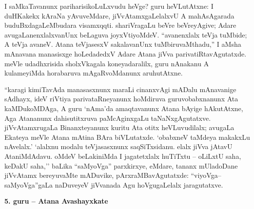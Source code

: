 I saMkaTavanunx pariharisikoLuLxvudu heVge? guru heVLutAtxne: I duHKakekx kAraNa yAvuveMdare, jiVvAtamxgaLelalxvU A mahAsAgarada buduBxdagaLeMbudara visamxqqti. shariVragaLu beVre beVreyAgive; Adare avugaLanenxlalxvanUnx beLaguva joyxVtiyoMdeV. ``avanenxlalx teVja tuMbide; A teVja avaneV. Atana teVjasesxV sakalavanUnx tuMbiruvaMthadu,'' I aMsha mAnavana manasisxge hoLedadedxV Adare Atana jiVva parivatiRtavAgutatxde. meVle udadhxrisida sholxVkagala koneyadaralilx, guru nAnakanu A kulameyiMda horabaruva mAgaRvoMdanunx aruhutAtxne.

``karagi kimiTavAda manasasxnunx maraLi cinanxvAgi mADalu mAnavanige sAdhayx, ideV riVtiya parivataRneyanunx hoMdiruva guruvobabxnanunx Ata kaMDukoMDAga, A guru `nAma'da amaqtavanunx Atana bAyige hAkutAtxne, Aga Atananunx dahisutitxruva paMcAginxgaLu taNaNxgAgutatxve. jiVvAtamxrugaLa Binanxteyanunx kuritu Ata otitx heVLuvudilalx; avugaLa Ekateya meVle Atana mAtina BAra biVLutatxde. `obabxneV taMdeya makakxLu nAvelalx.' `alalxnu modalu teVjasasxnunx saqSiTxsidanu. elalx jiVva jAtavU AtaniMdAdavu. oMdeV beLakiniMda I jagatetxlalx huTiTxtu -- oLiLxtU saha, keDakU saha,'' baLika ``saMyoVga'' parxkirxye, eMdare, tananx mUladoDane jiVvAtamx bereyuvaMte mADuvike, pArxraMBavAgutatxde: ``viyoVga--saMyoVga''gaLa naDuveyeV jiVvanada Agu hoVgugaLelalx jaragutatxve.

\bigskip
\begin{center}
{\Large\bf 5. guru -- Atana Avashayxkate}
\end{center}

